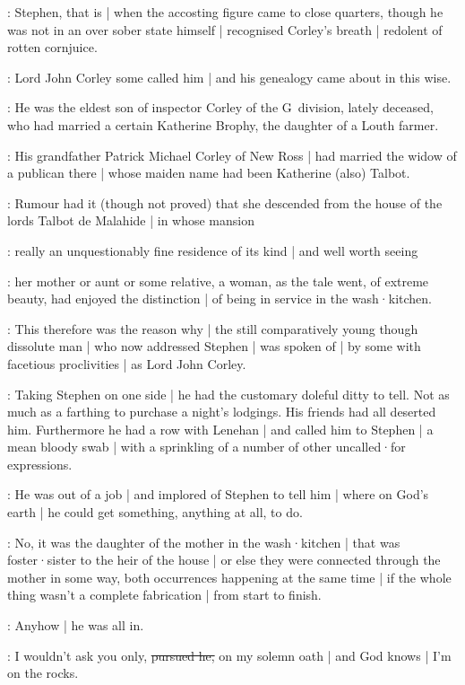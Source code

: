 :
Stephen,
that is |
when the accosting figure came to close quarters,
though he was not in an over sober state himself |
recognised Corley's breath |
redolent of rotten cornjuice.%

:
Lord John Corley some called him |
and his genealogy came about in this wise.

:
He was the eldest son of inspector Corley of the G~division,
lately deceased,
who had married a certain Katherine Brophy,
the daughter of a Louth farmer.

:
His grandfather Patrick Michael Corley of New Ross |
had married the widow of a publican there |
whose maiden name had been Katherine (also) Talbot.

:
Rumour had it (though not proved)
that she descended from the house of the lords Talbot de Malahide |
in whose mansion

:
really an unquestionably fine residence of its kind |
and well worth seeing

:
her mother or aunt or some relative,
a woman,
as the tale went,
of extreme beauty,
had enjoyed the distinction |
of being in service in the wash·kitchen.%

:
This therefore was the reason why |
the still comparatively young though dissolute man |
who now addressed Stephen |
was spoken of |
by some with facetious proclivities |
as Lord John Corley.

:
Taking Stephen on one side |
he had the customary doleful ditty to tell.
Not as much as a farthing to purchase a night's lodgings.
His friends had all deserted him.
Furthermore he had a row with Lenehan |
and called him to Stephen |
a mean bloody swab |
with a sprinkling of a number of other uncalled·for expressions.

:
He was out of a job |
and implored of Stephen to tell him |
where on God's earth |
he could get something,
anything at all,
to do.

:
No,
it was the daughter of the mother in the wash·kitchen |
that was foster·sister to the heir of the house |
or else they were connected through the mother in some way,
both occurrences happening at the same time |
if the whole thing wasn't a complete fabrication |
from start to finish.

:
Anyhow |
he was all in.

\LordJohnCorley:
I wouldn't ask you only,
\sout{pursued he,}
on my solemn oath |
and God knows |
I'm on the rocks.

